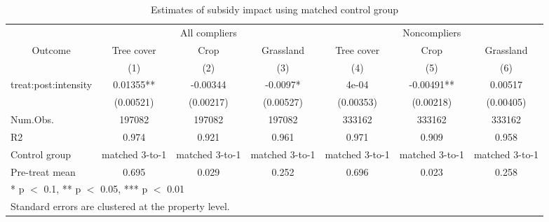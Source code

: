 \begin{table}[!h]
\centering\centering
\caption{Estimates of subsidy impact using matched control group}
\centering
\begin{tabular}[t]{lcccccc}
\toprule
\multicolumn{1}{c}{ } & \multicolumn{3}{c}{All compliers} & \multicolumn{3}{c}{Noncompliers} \\
\cmidrule(l{3pt}r{3pt}){2-4} \cmidrule(l{3pt}r{3pt}){5-7}
\multicolumn{1}{c}{Outcome} & \multicolumn{1}{c}{Tree cover} & \multicolumn{1}{c}{Crop} & \multicolumn{1}{c}{Grassland} & \multicolumn{1}{c}{Tree cover} & \multicolumn{1}{c}{Crop} & \multicolumn{1}{c}{Grassland} \\
\cmidrule(l{3pt}r{3pt}){1-1} \cmidrule(l{3pt}r{3pt}){2-2} \cmidrule(l{3pt}r{3pt}){3-3} \cmidrule(l{3pt}r{3pt}){4-4} \cmidrule(l{3pt}r{3pt}){5-5} \cmidrule(l{3pt}r{3pt}){6-6} \cmidrule(l{3pt}r{3pt}){7-7}
  & (1) & (2) & (3) & (4) & (5) & (6)\\
\midrule
treat:post:intensity & 0.01355** & -0.00344 & -0.0097* & 4e-04 & -0.00491** & 0.00517\\
 & (0.00521) & (0.00217) & (0.00527) & (0.00353) & (0.00218) & (0.00405)\\
\midrule
Num.Obs. & 197082 & 197082 & 197082 & 333162 & 333162 & 333162\\
R2 & 0.974 & 0.921 & 0.961 & 0.971 & 0.909 & 0.958\\
Control group & matched 3-to-1 & matched 3-to-1 & matched 3-to-1 & matched 3-to-1 & matched 3-to-1 & matched 3-to-1\\
Pre-treat mean & 0.695 & 0.029 & 0.252 & 0.696 & 0.023 & 0.258\\
\bottomrule
\multicolumn{7}{l}{\rule{0pt}{1em}* p $<$ 0.1, ** p $<$ 0.05, *** p $<$ 0.01}\\
\multicolumn{7}{l}{\rule{0pt}{1em}Standard errors are clustered at the property level.}\\
\end{tabular}
\end{table}

